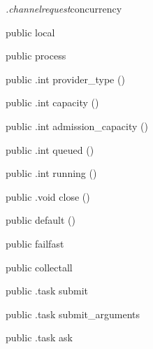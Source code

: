 \begin{CrexxClass}{\textit{.channelrequest}}{concurrency}

  \begin{Hierarchy}
  \end{Hierarchy}

  \begin{Members}

    \Factory
      {public}
      {local}
      {}

    \Factory
      {public}
      {process}
      {}

    \Method
      {public}
      {.int}
      {provider\_type}
      {()}

    \Method
      {public}
      {.int}
      {capacity}
      {()}

    \Method
      {public}
      {.int}
      {admission\_capacity}
      {()}

    \Method
      {public}
      {.int}
      {queued}
      {()}

    \Method
      {public}
      {.int}
      {running}
      {()}

    \Method
      {public}
      {.void}
      {close}
      {()}

    \Factory
      {public}
      {default}
      {()}

    \Factory
      {public}
      {failfast}
      {}

    \Factory
      {public}
      {collectall}
      {}

    \Method
      {public}
      {.task}
      {submit}
      {}

    \Method
      {public}
      {.task}
      {submit\_arguments}
      {}

    \Method
      {public}
      {.task}
      {ask}
      {}


\end{Members}
\end{CrexxClass}
